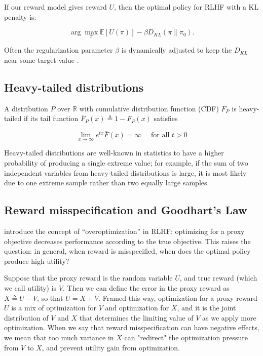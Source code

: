 \documentclass{article}
\begin{document}
If our reward model gives reward $U$, then the optimal policy for RLHF with a KL penalty is:

$$
\arg \max_{\pi} \mathbb{E} [U(\pi)]-\beta D_{KL}\left(\pi \| \pi_0 \right).
$$

Often the regularization parameter $\beta$ is dynamically adjusted to keep the $D_{KL}$ near some target value \citep{ziegler2020finetuning}.

\subsection{Heavy-tailed distributions}

A distribution $P$ over $\mathbb R$ with cumulative distribution function (CDF) $F_P$ is heavy-tailed if its tail function $\bar F_P(x) \triangleq 1 - F_P(x)$ satisfies

\[
\lim _{x \rightarrow \infty} e^{t x} \bar{F}(x)=\infty \quad \text { for all } t>0
\]

Heavy-tailed distributions are well-known in statistics to have a higher probability of producing a single extreme value; for example, if the sum of two independent variables from heavy-tailed distributions is large, it is most likely due to one extreme sample rather than two equally large samples.

\subsection{Reward misspecification and Goodhart's Law\label{sec:goodhart}}

\citet{gao2023scaling} introduce the concept of ``overoptimization'' in RLHF:  optimizing for a proxy objective decreases performance according to the true objective. This raises the question: in general, when reward is misspecified, when does the optimal policy produce high utility?

Suppose that the proxy reward is the random variable $U$, and true reward (which we call utility) is $V$. Then we can define the error in the proxy reward as $X \triangleq U - V$, so that $U = X + V$. Framed this way, optimization for a proxy reward $U$ is a mix of optimization for $V$ and optimization for $X$, and it is the joint distribution of $V$ and $X$ that determines the limiting value of $V$ as we apply more optimization. When we say that reward misspecification can have negative effects, we mean that too much variance in $X$ can "redirect" the optimization pressure from $V$ to $X$, and prevent utility gain from optimization.
\end{document}
